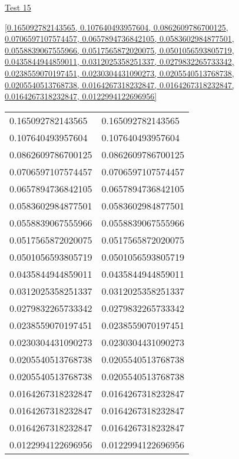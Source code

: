 \documentclass[12pt]{article}
\begin{document}
\noindent \url{Test 15}

\noindent \url{[0.165092782143565, 0.107640493957604, 0.0862609786700125, 0.0706597107574457, 0.0657894736842105, 0.0583602984877501, 0.0558839067555966, 0.0517565872020075, 0.0501056593805719, 0.0435844944859011, 0.0312025358251337, 0.0279832265733342, 0.0238559070197451, 0.0230304431090273, 0.0205540513768738, 0.0205540513768738, 0.0164267318232847, 0.0164267318232847, 0.0164267318232847, 0.0122994122696956]}

\noindent\begin{tt}
\begin{small}
\begin{bundle}{}
\end{bundle}
\end{small}
\end{tt}
\newpage%
\begin{tabular}{l l}0.165092782143565	&	0.165092782143565\\
0.107640493957604	&	0.107640493957604\\
0.0862609786700125	&	0.0862609786700125\\
0.0706597107574457	&	0.0706597107574457\\
0.0657894736842105	&	0.0657894736842105\\
0.0583602984877501	&	0.0583602984877501\\
0.0558839067555966	&	0.0558839067555966\\
0.0517565872020075	&	0.0517565872020075\\
0.0501056593805719	&	0.0501056593805719\\
0.0435844944859011	&	0.0435844944859011\\
0.0312025358251337	&	0.0312025358251337\\
0.0279832265733342	&	0.0279832265733342\\
0.0238559070197451	&	0.0238559070197451\\
0.0230304431090273	&	0.0230304431090273\\
0.0205540513768738	&	0.0205540513768738\\
0.0205540513768738	&	0.0205540513768738\\
0.0164267318232847	&	0.0164267318232847\\
0.0164267318232847	&	0.0164267318232847\\
0.0164267318232847	&	0.0164267318232847\\
0.0122994122696956	&	0.0122994122696956\\
\end{tabular}\newpage
\end{document}
